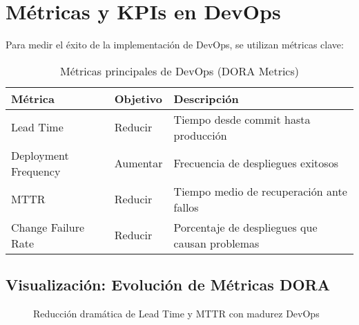 \documentclass[12pt,a4paper]{article}
\begin{document}
\section{Métricas y KPIs en DevOps}
Para medir el éxito de la implementación de DevOps, se utilizan métricas clave:

\begin{table}[h!]
\centering
\begin{tabular}{|l|l|p{6cm}|}
\hline
\textbf{Métrica} & \textbf{Objetivo} & \textbf{Descripción} \\
\hline
Lead Time & Reducir & Tiempo desde commit hasta producción \\
\hline
Deployment Frequency & Aumentar & Frecuencia de despliegues exitosos \\
\hline
MTTR & Reducir & Tiempo medio de recuperación ante fallos \\
\hline
Change Failure Rate & Reducir & Porcentaje de despliegues que causan problemas \\
\hline
\end{tabular}
\caption{Métricas principales de DevOps (DORA Metrics)}
\end{table}

\subsection{Visualización: Evolución de Métricas DORA}
\begin{figure}[h!]
\centering
{}
\caption{Reducción dramática de Lead Time y MTTR con madurez DevOps}
\end{figure}
\end{document}
